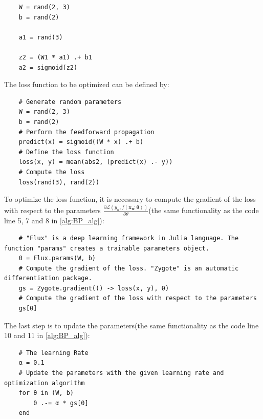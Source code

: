\documentclass[
	parskip, 			   %
	twoside, 			   %
	DIV=14, 			   %
	BCOR=15.0mm, 		   %
	headsepline, 		   %
	open=right, 		   %
	captions=tableheading, %
	bibliography=totoc,    %
	numbers=noenddot       %
]{scrreprt}
\begin{document}
\begin{verbatim}
    W = rand(2, 3)
    b = rand(2)
    
    a1 = rand(3)

    z2 = (W1 * a1) .+ b1
    a2 = sigmoid(z2)
\end{verbatim}

The loss function to be optimized can be defined by:

\begin{verbatim}
    # Generate random parameters
    W = rand(2, 3)
    b = rand(2)
    # Perform the feedforward propagation
    predict(x) = sigmoid((W * x) .+ b)
    # Define the loss function
    loss(x, y) = mean(abs2, (predict(x) .- y))
    # Compute the loss
    loss(rand(3), rand(2))
\end{verbatim}

To optimize the loss function, it is necessary to compute the gradient of the loss with respect to the parameters $\frac{\partial \mathcal{L}\left( y_{n},f(\mathbf{x_{n}};\mathbf{\theta}) \right)}{\partial \theta}$(the same functionality as the code line 5, 7 and 8 in \ref{alg:BP_alg}):

\begin{verbatim}
    # "Flux" is a deep learning framework in Julia language. The function "params" creates a trainable parameters object.
    θ = Flux.params(W, b)
    # Compute the gradient of the loss. "Zygote" is an automatic differentiation package.
    gs = Zygote.gradient(() -> loss(x, y), θ)
    # Compute the gradient of the loss with respect to the parameters
    gs[θ]
\end{verbatim}

The last step is to update the parameters(the same functionality as the code line 10 and 11 in \ref{alg:BP_alg}):

\begin{verbatim}
    # The learning Rate
    α = 0.1
    # Update the parameters with the given learning rate and optimization algorithm
    for θ in (W, b)
        θ .-= α * gs[θ]
    end
\end{verbatim}
\end{document}
